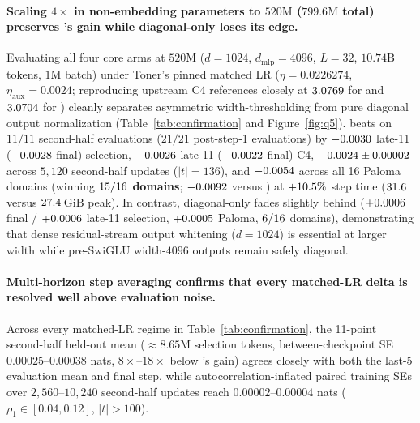 \paragraph{Scaling $4\times$ in non-embedding parameters to $520\text{M}$ ($799.6\text{M}$ total) preserves 's gain while diagonal-only  loses its edge.}
Evaluating all four core arms at $520\text{M}$ ($d=1024$, $d_{\text{mlp}}=4096$,
$L=32$, $10.74\text{B}$ tokens, $1\text{M}$ batch) under Toner's pinned matched
LR ($\eta = 0.0226274$, $\eta_{\text{aux}} = 0.0024$; reproducing upstream C4
references closely at $3.0769{}$ for  and
$3.0704{}$ for ) cleanly separates
asymmetric width-thresholding from pure diagonal output normalization
(Table~\ref{tab:confirmation} and Figure~\ref{fig:q5}). 
beats  on $11/11$ second-half evaluations ($21/21$ post-step-1
evaluations) by $-0.0030{}$ late-11 ($-0.0028{}$ final)
selection, $-0.0026{}$ late-11 ($-0.0022{}$ final)
C4, $-0.0024{} \pm 0.00002{}$ across $5{,}120$
second-half updates ($|t| = 136$), and $-0.0054{}$ across all 16
Paloma domains (winning \textbf{$15{}/16$ domains};
$-0.0092{}$ versus ) at $+10.5\%$
step time ($31.6{}$ versus $27.4{}$\,GiB peak). In
contrast, diagonal-only  fades slightly behind 
($+0.0006{}$ final / $+0.0006{}$ late-11 selection,
$+0.0005{}$ Paloma, $6{}/16$ domains),
demonstrating that dense residual-stream output whitening ($d=1024$) is
essential at larger width while pre-SwiGLU width-$4096$ outputs remain safely
diagonal.

\paragraph{Multi-horizon step averaging confirms that every matched-LR delta is resolved well above evaluation noise.}
Across every matched-LR regime in Table~\ref{tab:confirmation}, the 11-point
second-half held-out mean ($\approx 8.65\text{M}$ selection tokens,
between-checkpoint SE $0.00025$--$0.00038$ nats, $8\times$--$18\times$ below
's gain) agrees closely with both the last-5 evaluation mean
and final step, while autocorrelation-inflated paired training SEs over
$2{,}560$--$10{,}240$ second-half updates reach $0.00002$--$0.00004$ nats
($\rho_1 \in [0.04, 0.12]$, $|t| > 100$).

